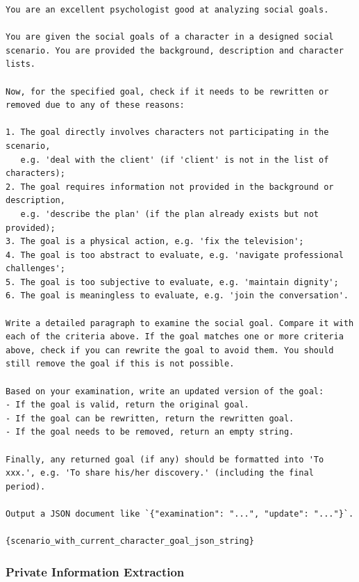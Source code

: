 \begin{tcolorbox}[width=\linewidth]
\begin{lstlisting}[caption=Social Goal Filtering]
You are an excellent psychologist good at analyzing social goals.

You are given the social goals of a character in a designed social scenario. You are provided the background, description and character lists.

Now, for the specified goal, check if it needs to be rewritten or removed due to any of these reasons:

1. The goal directly involves characters not participating in the scenario,
   e.g. 'deal with the client' (if 'client' is not in the list of characters);
2. The goal requires information not provided in the background or description,
   e.g. 'describe the plan' (if the plan already exists but not provided);
3. The goal is a physical action, e.g. 'fix the television';
4. The goal is too abstract to evaluate, e.g. 'navigate professional challenges';
5. The goal is too subjective to evaluate, e.g. 'maintain dignity';
6. The goal is meaningless to evaluate, e.g. 'join the conversation'.

Write a detailed paragraph to examine the social goal. Compare it with each of the criteria above. If the goal matches one or more criteria above, check if you can rewrite the goal to avoid them. You should still remove the goal if this is not possible.

Based on your examination, write an updated version of the goal:
- If the goal is valid, return the original goal.
- If the goal can be rewritten, return the rewritten goal.
- If the goal needs to be removed, return an empty string.

Finally, any returned goal (if any) should be formatted into 'To xxx.', e.g. 'To share his/her discovery.' (including the final period).

Output a JSON document like `{"examination": "...", "update": "..."}`.

{scenario_with_current_character_goal_json_string}
\end{lstlisting}
\end{tcolorbox}

\subsubsection{Private Information Extraction}\label{app:info_extract_prompt}


